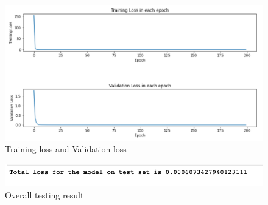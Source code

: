 \begin{figure}[H]
    \caption{Training loss and Validation loss}
    \includegraphics[scale=0.6]{Report LaTeX/figures/mantle_convection_images/larger_dataset_interpolated/ConvAE_trainingData.png}
\end{figure}

\begin{figure}[H]
    \caption{Overall testing result}
    \includegraphics[scale=0.8]{Report LaTeX/figures/mantle_convection_images/larger_dataset_interpolated/ConvAE_OverallTesting.png}
\end{figure}

